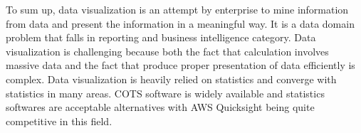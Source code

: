 \documentclass[12pt]{article}
\begin{document}
\begin{flushleft}
To sum up, data visualization is an attempt by enterprise to mine information from data and present the information in a meaningful way. It is a data domain problem that falls in reporting and business intelligence category. Data visualization is challenging because both the fact that calculation involves massive data and the fact that produce proper presentation of data efficiently is complex. Data visualization is heavily relied on statistics and converge with statistics in many areas. COTS software is widely available and statistics softwares are acceptable alternatives with AWS Quicksight being quite competitive in this field.
\end{flushleft}
\clearpage

\begin{center}


\end{center}
\end{document}
